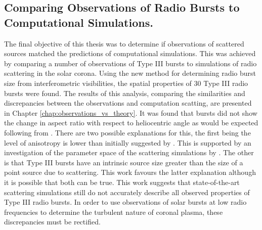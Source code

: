\subsection{Comparing Observations of Radio Bursts to Computational Simulations.}
The final objective of this thesis was to determine if observations of scattered sources matched the predictions of computational simulations. This was achieved by comparing a number of observations of Type III bursts to simulations of radio scattering in the solar corona.
Using the new method for determining radio burst size from interferometric visibilities, the spatial properties of 30 Type III radio bursts were found. The results of this analysis, comparing the similarities and discrepancies between the observations and computation scatting, are presented in Chapter \ref{chap:observations_vs_theory}.%
It was found that bursts did not show the change in aspect ratio with respect to heliocentric angle as would be expected following from \cite{Kontar2019}. There are two possible explanations for this, the first being the level of anisotropy is lower than initially suggested by \cite{Kontar2019}. This is supported by an investigation of the parameter space of the scattering simulations by \cite{Zhang2021}. The other is that Type III bursts have an intrinsic source size greater than the size of a point source due to scattering. This work favours the latter explanation although it is possible that both can be true. This work suggests that state-of-the-art scattering simulations still do not accurately describe all observed properties of Type III radio bursts. In order to use observations of solar bursts at low radio frequencies to determine the turbulent nature of coronal plasma, these discrepancies must be rectified.

